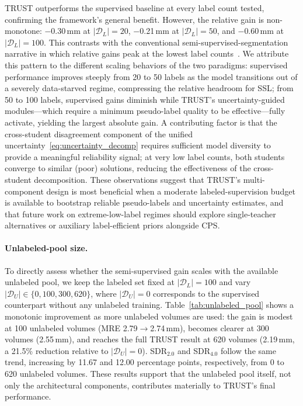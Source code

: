 \documentclass[conference]{IEEEtran}
\begin{document}
TRUST outperforms the supervised baseline at every label count tested, confirming the framework's general benefit. However, the relative gain is non-monotone: $-$0.30\,mm at $|\mathcal{D}_L|=20$, $-$0.21\,mm at $|\mathcal{D}_L|=50$, and $-$0.60\,mm at $|\mathcal{D}_L|=100$. This contrasts with the conventional semi-supervised-segmentation narrative in which relative gains peak at the lowest label counts~\cite{Yu2019_uncertainty_aware,Wang2022_u2pl}. We attribute this pattern to the different scaling behaviors of the two paradigms: supervised performance improves steeply from 20 to 50 labels as the model transitions out of a severely data-starved regime, compressing the relative headroom for SSL; from 50 to 100 labels, supervised gains diminish while TRUST's uncertainty-guided modules---which require a minimum pseudo-label quality to be effective---fully activate, yielding the largest absolute gain. A contributing factor is that the cross-student disagreement component of the unified uncertainty~\eqref{eq:uncertainty_decomp} requires sufficient model diversity to provide a meaningful reliability signal; at very low label counts, both students converge to similar (poor) solutions, reducing the effectiveness of the cross-student decomposition. These observations suggest that TRUST's multi-component design is most beneficial when a moderate labeled-supervision budget is available to bootstrap reliable pseudo-labels and uncertainty estimates, and that future work on extreme-low-label regimes should explore single-teacher alternatives or auxiliary label-efficient priors alongside CPS.

\paragraph{Unlabeled-pool size.}
To directly assess whether the semi-supervised gain scales with the available unlabeled pool, we keep the labeled set fixed at $|\mathcal{D}_L|=100$ and vary $|\mathcal{D}_U| \in \{0, 100, 300, 620\}$, where $|\mathcal{D}_U|=0$ corresponds to the supervised counterpart without any unlabeled training. Table~\ref{tab:unlabeled_pool} shows a monotonic improvement as more unlabeled volumes are used: the gain is modest at 100 unlabeled volumes (MRE 2.79$\to$2.74\,mm), becomes clearer at 300 volumes (2.55\,mm), and reaches the full TRUST result at 620 volumes (2.19\,mm, a 21.5\% reduction relative to $|\mathcal{D}_U|=0$). SDR$_{2.0}$ and SDR$_{4.0}$ follow the same trend, increasing by 11.67 and 12.00 percentage points, respectively, from 0 to 620 unlabeled volumes. These results support that the unlabeled pool itself, not only the architectural components, contributes materially to TRUST's final performance.
\end{document}
